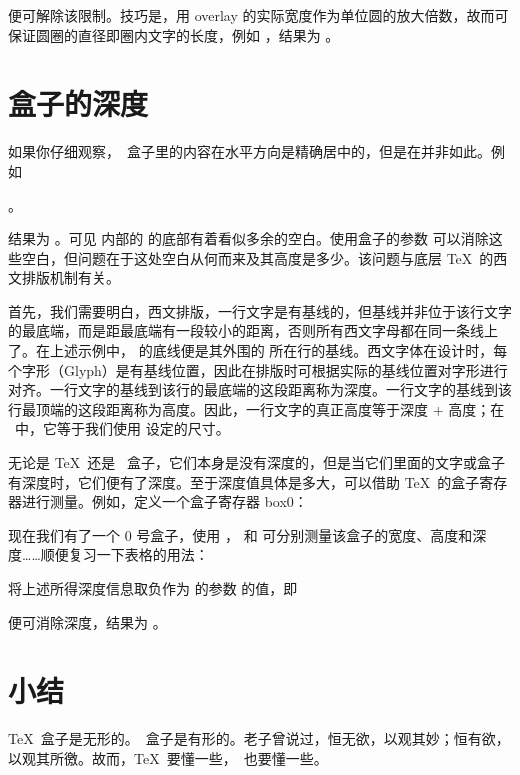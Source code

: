\noindent 便可解除该限制。技巧是，用 overlay 的实际宽度作为单位圆的放大倍数，故而可保证圆圈的直径即圈内文字的长度，例如 ，结果为 。

\section{盒子的深度}

如果你仔细观察，\ConTeXt\ 盒子里的内容在水平方向是精确居中的，但是在并非如此。例如

\starttyping[option=TEX]
。
\stoptyping

\noindent 结果为 。可见 \type{\inframed} 内部的 \type{\framed} 的底部有着看似多余的空白。使用盒子的参数  可以消除这些空白，但问题在于这处空白从何而来及其高度是多少。该问题与底层 \TeX\ 的西文排版机制有关。

首先，我们需要明白，西文排版，一行文字是有基线的，但基线并非位于该行文字的最底端，而是距最底端有一段较小的距离，否则所有西文字母都在同一条线上了。在上述示例中，\type{\framed} 的底线便是其外围的 \type{\inframed} 所在行的基线。西文字体在设计时，每个字形（Glyph）是有基线位置，因此在排版时可根据实际的基线位置对字形进行对齐。一行文字的基线到该行的最底端的这段距离称为深度。一行文字的基线到该行最顶端的这段距离称为高度。因此，一行文字的真正高度等于深度 + 高度；在 \ConTeXt\ 中，它等于我们使用 \type{\setupinterlinespace} 设定的尺寸。

无论是 \TeX\ 还是 \ConTeXt\ 盒子，它们本身是没有深度的，但是当它们里面的文字或盒子有深度时，它们便有了深度。至于深度值具体是多大，可以借助 \TeX\ 的盒子寄存器进行测量。例如，定义一个盒子寄存器 box0：

\starttyping[option=TEX]
\hbox{}
\stoptyping

\noindent 现在我们有了一个 0 号盒子，使用 \type{\wd}，\type{\ht} 和 \type{\dp} 可分别测量该盒子的宽度、高度和深度……顺便复习一下表格的用法：

\starttyping[option=TEX]
\stoptyping
{}\hbox{}
\setupcaption[table][location=top]

将上述所得深度信息取负作为 \type{\inframed} 的参数  的值，即

\starttyping[option=TEX]
\stoptyping

\noindent 便可消除深度，结果为 。

\section{小结}

\TeX\ 盒子是无形的。\ConTeXt\ 盒子是有形的。老子曾说过，恒无欲，以观其妙；恒有欲，以观其所徼。故而，\TeX\ 要懂一些，\ConTeXt\ 也要懂一些。
